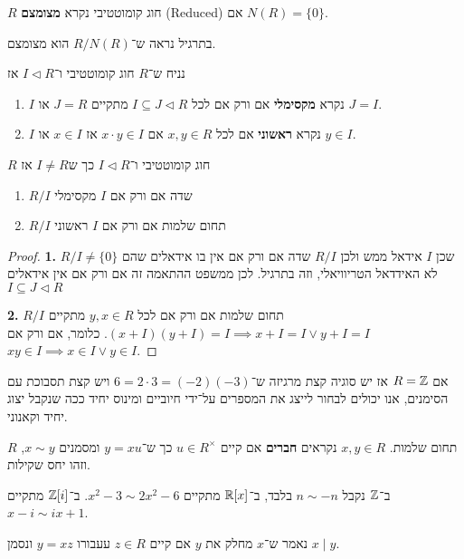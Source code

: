 \begin{definition}
	$R$ חוג קומוטטיבי נקרא \textbf{מצומצם} (Reduced) אם $N(R) = \{ 0 \}$.
\end{definition}
בתרגיל נראה ש־$R / N(R)$ הוא מצומצם.
\begin{definition}
	נניח ש־$R$ חוג קומוטטיבי ו־$I \triangleleft R$ אז
	\begin{enumerate}
		\item $I$ נקרא \textbf{מקסימלי} אם ורק אם לכל $I \subseteq J \triangleleft R$ מתקיים $J = R$ או $J = I$.
		\item $I$ נקרא \textbf{ראשוני} אם לכל $x, y \in R$ אם $x \cdot y \in I$ אז $x \in I$ או $y \in I$.
	\end{enumerate}
\end{definition}
\begin{proposition}
	$R$ חוג קומוטטיבי ו־$I \triangleleft R$ כך ש$I \ne R$ אז
	\begin{enumerate}
		\item $R / I$ שדה אם ורק אם $I$ מקסימלי
		\item $R / I$ תחום שלמות אם ורק אם $I$ ראשוני
	\end{enumerate}
\end{proposition}
\begin{proof}
	\textbf{1.}
	$R / I \ne \{ 0 \}$ שכן $I$ אידאל ממש ולכן $R / I$ שדה אם ורק אם אין בו אידאלים שהם לא האידדאל הטריוויאלי, וזה בתרגיל.
	לכן ממשפט ההתאמה זה אם ורק אם אין אידאלים $I \subseteq J \triangleleft R$

	\textbf{2.}
	$R / I$ תחום שלמות אם ורק אם לכל $y, x \in R$ מתקיים $(x + I)(y + I) = I \implies x + I = I \lor y + I = I$.
	כלומר, אם ורק אם $xy \in I \implies x \in I \lor y \in I$.
\end{proof}
אם $R = \mathbb{Z}$ אז יש סוגיה קצת מרגיזה ש־$6 = 2 \cdot 3 = (-2)(-3)$ ויש קצת תסבוכת עם הסימנים, אנו יכולים לבחור לייצג את המספרים על־ידי חיוביים ומינוס יחיד ככה שנקבל יצוג יחיד וקאנוני.
\begin{definition}[חברים]
	$R$ תחום שלמות. $x, y \in R$ נקראים \textbf{חברים} אם קיים $u \in R^\times$ כך ש־$y = xu$ ומסמנים $x \sim y$, וזהו יחס שקילות.
\end{definition}
\begin{example}
	ב־$\mathbb{Z}$ נקבל $n \sim -n$ בלבד, ב־$\mathbb{R}[x]$ מתקיים $x^2 - 3 \sim 2x^2 - 6$.
	ב־$\mathbb{Z}[i]$ מתקיים $x - i \sim ix + 1$.
\end{example}
\begin{definition}[מחלק]
	נאמר ש־$x$ מחלק את $y$ אם קיים $z \in R$ עעבורו $y = xz$ ונסמן $x \mid y$.
\end{definition}

